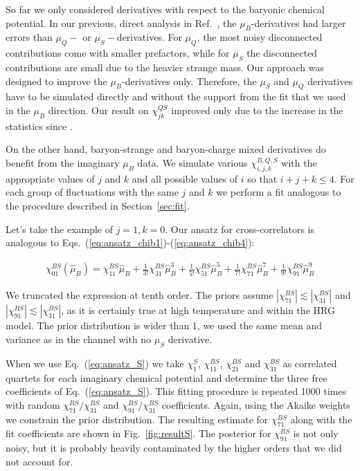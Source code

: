 \documentclass[a4paper,11pt]{article}
\begin{document}
So far we only considered  derivatives with respect to the baryonic chemical potential.
In our previous, direct analysis in Ref.~\cite{Bellwied:2015lba},
the $\mu_B$-derivatives had larger errors than $\mu_Q-$ or $\mu_S-$derivatives. For $\mu_Q$, the most noisy disconnected contributions come with
smaller prefactors, while for $\mu_S$ the disconnected contributions are
small due to the heavier strange mass. Our approach was designed to
improve the $\mu_B$-derivatives only. 
Therefore, the $\mu_S$ and $\mu_Q$ derivatives have to be simulated directly
and without the support from the fit that we used in the $\mu_B$ direction. 
Our result on $\chi^{QS}_{jk}$ improved only due to the increase in the
statistics since \cite{Bellwied:2015lba}. 

On the other hand, baryon-strange and baryon-charge mixed derivatives do benefit from the
imaginary $\mu_B$ data.
We simulate various $ \chi^{B,Q,S}_{i,j,k}$ with the appropriate values of $j$ and
$k$ and all possible values of $i$ so that $ i+j+k \leq 4$.
For each group of fluctuations with the same $j$ and $k$ we perform a fit
analogous to the procedure described in Section~\ref{sec:fit}.


Let's take the example of $j=1, k=0$.
Our ansatz for cross-correlators is analogous to
Eqs.~(\ref{eq:ansatz_chib1})-(\ref{eq:ansatz_chib4}):

\begin{align}
\chi_{01}^{BS}(\hat \mu_B) =
\chi_{11}^{BS} \hat\mu_B
+ \frac{1}{3!} \chi_{31}^{BS} \hat\mu_B^3
+ \frac{1}{5!} \chi_{51}^{BS} \hat\mu_B^5
+ \frac{1}{7!} \chi_{71}^{BS} \hat\mu_B^7
+ \frac{1}{9!} \chi_{91}^{BS} \hat\mu_B^9
\label{eq:ansatz_S}
\end{align}

We truncated the expression at tenth order. The priors assume $|\chi_{71}^{BS}|\lesssim |\chi_{31}^{BS}|$
and $|\chi_{91}^{BS}|\lesssim |\chi_{31}^{BS}|$, as it is certainly true at high temperature and within the HRG model.
The prior distribution is wider than 1, we used the same mean and variance as in the channel
with no $\mu_S$ derivative.

When we use Eq.~(\ref{eq:ansatz_S}) we take 
$\chi^{S}_{1}$, $\chi^{BS}_{11}$, $\chi^{BS}_{21}$ and $\chi^{BS}_{31}$ as correlated quartets for each
imaginary chemical potential and determine the three free coefficients of Eq.~(\ref{eq:ansatz_S}).
This fitting procedure is repeated 1000 times with random
$\chi^{BS}_{71}/\chi^{BS}_{31}$ and $\chi^{BS}_{91}/\chi^{BS}_{31}$ coefficients.
Again, using the Akaike weights we constrain the prior distribution. The resulting estimate for $\chi_{71}^{BS}$
along with the fit coefficients are shown in Fig.~\ref{fig:resultS}. The posterior for $\chi_{91}^{BS}$ is not
only noisy, but it is probably heavily contaminated by the higher orders that we did not account for.
\end{document}
